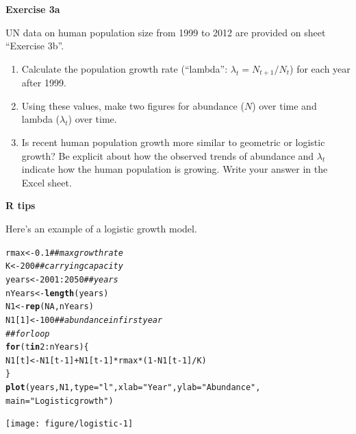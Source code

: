 \documentclass[12pt]{article}\usepackage[]{graphicx}\usepackage[]{color}
\makeatletter
\newcommand{\hlnum}[1]{\textcolor[rgb]{0.686,0.059,0.569}{#1}}%
\newcommand{\hlstr}[1]{\textcolor[rgb]{0.192,0.494,0.8}{#1}}%
\newcommand{\hlcom}[1]{\textcolor[rgb]{0.678,0.584,0.686}{\textit{#1}}}%
\newcommand{\hlopt}[1]{\textcolor[rgb]{0,0,0}{#1}}%
\newcommand{\hlstd}[1]{\textcolor[rgb]{0.345,0.345,0.345}{#1}}%
\newcommand{\hlkwa}[1]{\textcolor[rgb]{0.161,0.373,0.58}{\textbf{#1}}}%
\newcommand{\hlkwb}[1]{\textcolor[rgb]{0.69,0.353,0.396}{#1}}%
\newcommand{\hlkwc}[1]{\textcolor[rgb]{0.333,0.667,0.333}{#1}}%
\newcommand{\hlkwd}[1]{\textcolor[rgb]{0.737,0.353,0.396}{\textbf{#1}}}%
\newenvironment{kframe}{%
 \def\at@end@of@kframe{}%
 \ifinner\ifhmode%
  \def\at@end@of@kframe{\end{minipage}}%
  \begin{minipage}{\columnwidth}%
 \fi\fi%
 \def\FrameCommand##1{\hskip\@totalleftmargin \hskip-\fboxsep
 \colorbox{shadecolor}{##1}\hskip-\fboxsep
     \hskip-\linewidth \hskip-\@totalleftmargin \hskip\columnwidth}%
 \MakeFramed {\advance\hsize-\width
   \@totalleftmargin\z@ \linewidth\hsize
   \@setminipage}}%
 {\par\unskip\endMakeFramed%
 \at@end@of@kframe}
\newenvironment{knitrout}{}{} %
\makeatother
\begin{document}
\vspace{24pt}

{\bf Exercise 3a \\}


UN data on human population size from 1999 to 2012 are provided on
sheet ``Exercise 3b''.


\begin{enumerate}
  \item Calculate the population growth rate (``lambda'':
    $\lambda_t = N_{t+1}/N_t$) for each year after 1999.
  \item Using these values, make two figures for abundance ($N$) over
    time and lambda ($\lambda_t$) over time. 
  \item Is recent human population growth more similar to geometric or
    logistic growth? Be explicit about how the observed trends of
    abundance and $\lambda_t$ indicate how the human population is
    growing. Write your answer in the Excel sheet.
\end{enumerate}



\newpage

{\bf R tips \\}


Here's an example of a logistic growth model.
\begin{knitrout}
\color{fgcolor}\begin{kframe}
\begin{alltt}
\hlstd{rmax} \hlkwb{<-} \hlnum{0.1}              \hlcom{## max growth rate}
\hlstd{K} \hlkwb{<-} \hlnum{200}                 \hlcom{## carrying capacity}
\hlstd{years} \hlkwb{<-} \hlnum{2001}\hlopt{:}\hlnum{2050}       \hlcom{## years}
\hlstd{nYears} \hlkwb{<-} \hlkwd{length}\hlstd{(years)}
\hlstd{N1} \hlkwb{<-} \hlkwd{rep}\hlstd{(}\hlnum{NA}\hlstd{, nYears)}
\hlstd{N1[}\hlnum{1}\hlstd{]} \hlkwb{<-} \hlnum{100}             \hlcom{## abundance in first year}
\hlcom{## for loop}
\hlkwa{for}\hlstd{(t} \hlkwa{in} \hlnum{2}\hlopt{:}\hlstd{nYears) \{}
    \hlstd{N1[t]} \hlkwb{<-} \hlstd{N1[t}\hlopt{-}\hlnum{1}\hlstd{]} \hlopt{+} \hlstd{N1[t}\hlopt{-}\hlnum{1}\hlstd{]}\hlopt{*}\hlstd{rmax}\hlopt{*}\hlstd{(}\hlnum{1} \hlopt{-} \hlstd{N1[t}\hlopt{-}\hlnum{1}\hlstd{]}\hlopt{/}\hlstd{K)}
\hlstd{\}}
\hlkwd{plot}\hlstd{(years, N1,} \hlkwc{type}\hlstd{=}\hlstr{"l"}\hlstd{,} \hlkwc{xlab}\hlstd{=}\hlstr{"Year"}\hlstd{,} \hlkwc{ylab}\hlstd{=}\hlstr{"Abundance"}\hlstd{,}
     \hlkwc{main}\hlstd{=}\hlstr{"Logistic growth"}\hlstd{)}
\end{alltt}
\end{kframe}

{\centering \texttt{[image: figure/logistic-1]} 

}



\end{knitrout}
\end{document}
